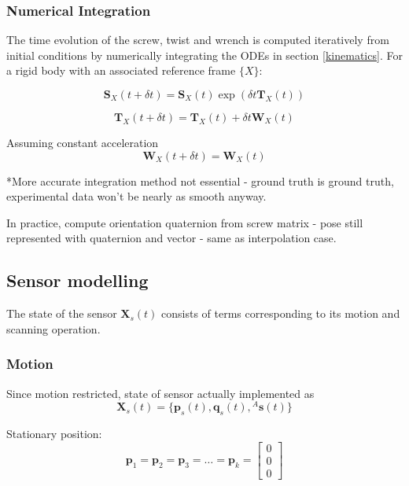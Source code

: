 \subsubsection{Numerical Integration} \label{integration}
The time evolution of the screw, twist and wrench is computed iteratively from initial conditions by numerically integrating the ODEs in section \ref{kinematics}. For a rigid body with an associated reference frame $\{X\}$:

\begin{equation}
	\mathbf{S}_X(t+\delta t) = \mathbf{S}_X(t)\exp({\delta t {\mathbf{T}_X(t)}})
\end{equation}

\begin{equation}
	\mathbf{T}_X(t+\delta t) = \mathbf{T}_X(t) + \delta t \mathbf{W}_X(t)
\end{equation}

Assuming constant acceleration
\begin{equation}
	\mathbf{W}_X(t+\delta t) =\mathbf{W}_X(t)
\end{equation}

*More accurate integration method not essential - ground truth is ground truth, experimental data won't be nearly as smooth anyway.

In practice, compute orientation quaternion from screw matrix - pose still represented with quaternion and vector - same as interpolation case.

\subsection{Sensor modelling}
The state of the sensor $\mathbf{X}_{s}(t)$ consists of terms corresponding to its motion and scanning operation. 

\subsubsection{Motion}
Since motion restricted, state of sensor actually implemented as 
\begin{equation}
	\mathbf{X}_{s}(t) = \{\mathbf{p}_s(t),\mathbf{q}_s(t),{^{A}\mathbf{s}(t)}\}
\end{equation}

Stationary position:
\begin{equation}
	\mathbf{p}_1 = \mathbf{p}_2 = \mathbf{p}_3 = \dots =  \mathbf{p}_k = 
	\begin{bmatrix}
		0 \\ 0 \\ 0
   	\end{bmatrix}
\end{equation}

